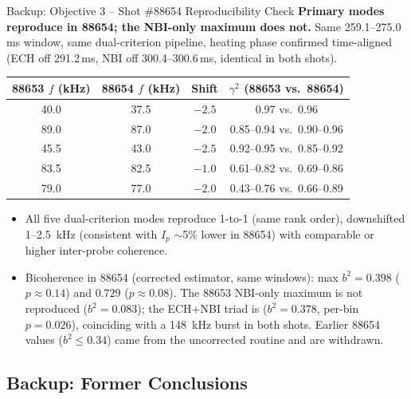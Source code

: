 \documentclass[aspectratio=169,xcolor=table]{beamer}
\begin{document}
\begin{frame}{Backup: Objective 3 -- Shot \#88654 Reproducibility Check}
    \footnotesize
    \textbf{Primary modes reproduce in 88654; the NBI-only maximum does not.}
    Same 259.1--275.0\,ms window, same dual-criterion pipeline, heating
    phase confirmed time-aligned (ECH off 291.2\,ms, NBI off
    300.4--300.6\,ms, identical in both shots).
    \vspace{0.15cm}
    \begin{center}
    \begin{tabular}{cccc}
        \toprule
        88653 $f$ (kHz) & 88654 $f$ (kHz) & Shift & $\gamma^2$ (88653 vs.\ 88654) \\
        \midrule
        40.0 & 37.5 & $-2.5$ & 0.97 vs.\ 0.96 \\
        89.0 & 87.0 & $-2.0$ & 0.85--0.94 vs.\ 0.90--0.96 \\
        45.5 & 43.0 & $-2.5$ & 0.92--0.95 vs.\ 0.85--0.92 \\
        83.5 & 82.5 & $-1.0$ & 0.61--0.82 vs.\ 0.69--0.86 \\
        79.0 & 77.0 & $-2.0$ & 0.43--0.76 vs.\ 0.66--0.89 \\
        \bottomrule
    \end{tabular}
    \end{center}
    \vspace{0.2cm}
    \begin{itemize}
        \item All five dual-criterion modes reproduce 1-to-1 (same rank
        order), downshifted 1--\SI{2.5}{kHz} (consistent with $I_p$
        $\sim$5\% lower in 88654) with comparable or higher inter-probe
        coherence.
        \item Bicoherence in 88654 (corrected estimator, same windows): max $b^2=0.398$ ($p\approx0.14$) and $0.729$ ($p\approx0.08$). The 88653 NBI-only maximum is not reproduced ($b^2=0.083$); the ECH+NBI triad is ($b^2=0.378$, per-bin $p=0.026$), coinciding with a \SI{148}{kHz} burst in both shots. Earlier 88654 values ($b^2\le0.34$) came from the uncorrected routine and are withdrawn.
    \end{itemize}
\end{frame}


\subsection{Backup: Former Conclusions}
\end{document}
